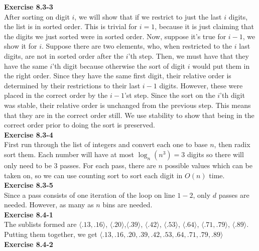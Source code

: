\documentclass{article}
\begin{document}
\noindent\textbf{Exercise 8.3-3}\\

After sorting on digit $i$, we will show that if we restrict to just the last $i$ digits, the list is in sorted order. This is trivial for $i=1$, because it is just claiming that the digits we just sorted were in sorted order. Now, suppose it's true for $i-1$, we show it for $i$. Suppose there are two elements, who, when restricted to the $i$ last digits, are not in sorted order after the $i$'th step. Then, we must have that they have the same $i$'th digit because otherwise the sort of digit $i$ would put them in the right order. Since they have the same first digit, their relative order is determined by their restrictions to their last $i-1$ digits. However, these were placed in the correct order by the $i-1$'st step. Since the sort on the $i$'th digit was stable, their relative order is unchanged from the previous step. This means that they are in the correct order still. We use stability to show that being in the correct order prior to doing the sort is preserved.\\

\noindent\textbf{Exercise 8.3-4}\\

First run through the list of integers and convert each one to base $n$, then radix sort them.  Each number will have at most $\log_n(n^3) = 3$ digits so there will only need to be 3 passes. For each pass, there are $n$ possible values which can be taken on, so we can use counting sort to sort each digit in $O(n)$ time.\\

\noindent\textbf{Exercise 8.3-5}\\

Since a pass consists of one iteration of the loop on line $1-2$, only $d$ passes are needed. However, as many as $n$ bins are needed.\\

\noindent\textbf{Exercise 8.4-1}\\

The sublists formed are $\langle .13, .16\rangle$, $\langle .20\rangle$,$\langle .39\rangle$, $\langle .42\rangle$, $\langle .53\rangle$, $\langle .64\rangle$, $\langle .71, .79\rangle$, $\langle .89\rangle$. Putting them together, we get $\langle .13,.16,.20,.39,.42,.53,.64,.71,.79,.89 \rangle$\\

\noindent\textbf{Exercise 8.4-2}\\
\end{document}
